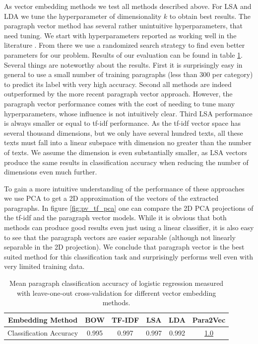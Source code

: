 As vector embedding methods we test all methods described above. For LSA and LDA we tune the hyperparameter of dimensionality $k$ to obtain best results. The paragraph vector method has several rather unintuitive hyperparameters, that need tuning. We start with hyperparameters reported as working well in the literature \citep{Lau2016}. From there we use a randomized search strategy to find even better parameters for our problem. Results of our evaluation can be found in table \ref{table:para_class_acc}. Several things are noteworthy about the results. First it is surprisingly easy in general to use a small number of training paragraphs (less than 300 per category) to predict its label with very high accuracy. Second all methods are indeed outperformed by the more recent paragraph vector approach. However, the paragraph vector performance comes with the cost of needing to tune many hyperparameters, whose influence is not intuitively clear. Third LSA performance is always smaller or equal to tf-idf performance. As the tf-idf vector space has several thousand dimensions, but we only have several hundred texts, all these texts must fall into a linear subspace with dimension no greater than the number of texts. We assume the dimension is even substantially smaller, as LSA vectors produce the same results in classification accuracy when reducing the number of dimensions even much further.

To gain a more intuitive understanding of the performance of these approaches we use PCA to get a 2D approximation of the vectors of the extracted paragraphs. In figure \ref{fig:pv_tf_pca} one can compare the 2D PCA projections of the tf-idf and the paragraph vector models. While it is obvious that both methods can produce good results even just using a linear classifier, it is also easy to see that the paragraph vectors are easier separable (although not linearly separable in the 2D projection). We conclude that paragraph vector is the best suited method for this classification task and surprisingly performs well even with very limited training data.
\begin{table}
	\begin{tabular}{|c||c|c|c|c|c|}
		\hline 
		Embedding Method & BOW & TF-IDF & LSA & LDA  & Para2Vec\tabularnewline
		\hline 
		\hline 
		Classification Accuracy & 0.995 & 0.997 & 0.997 & 0.992 & \underline{1.0}\tabularnewline
		\hline 
	\end{tabular}
	\caption{Mean paragraph classification accuracy of logistic regression measured with leave-one-out cross-validation for different vector embedding methods.}
	\label{table:para_class_acc}
\end{table}

